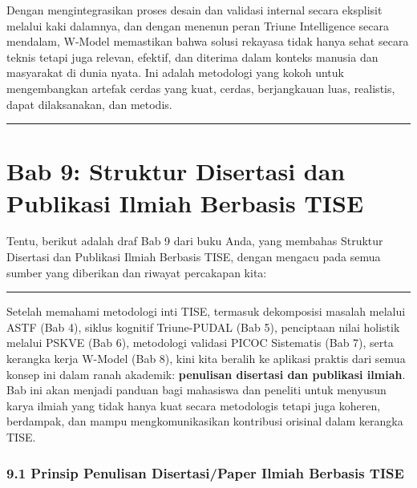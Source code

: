 \documentclass[
  letterpaper,
  DIV=11,
  numbers=noendperiod]{scrreprt}
\begin{document}
Dengan mengintegrasikan proses desain dan validasi internal secara
eksplisit melalui kaki dalamnya, dan dengan menenun peran Triune
Intelligence secara mendalam, W-Model memastikan bahwa solusi rekayasa
tidak hanya sehat secara teknis tetapi juga relevan, efektif, dan
diterima dalam konteks manusia dan masyarakat di dunia nyata. Ini adalah
metodologi yang kokoh untuk mengembangkan artefak cerdas yang kuat,
cerdas, berjangkauan luas, realistis, dapat dilaksanakan, dan metodis.

\begin{center}\rule{0.5\linewidth}{0.5pt}\end{center}


\chapter{\texorpdfstring{\textbf{Bab 9: Struktur Disertasi dan Publikasi
Ilmiah Berbasis
TISE}}{Bab 9: Struktur Disertasi dan Publikasi Ilmiah Berbasis TISE}}\label{bab-9-struktur-disertasi-dan-publikasi-ilmiah-berbasis-tise}

Tentu, berikut adalah draf Bab 9 dari buku Anda, yang membahas Struktur
Disertasi dan Publikasi Ilmiah Berbasis TISE, dengan mengacu pada semua
sumber yang diberikan dan riwayat percakapan kita:

\begin{center}\rule{0.5\linewidth}{0.5pt}\end{center}

Setelah memahami metodologi inti TISE, termasuk dekomposisi masalah
melalui ASTF (Bab 4), siklus kognitif Triune-PUDAL (Bab 5), penciptaan
nilai holistik melalui PSKVE (Bab 6), metodologi validasi PICOC
Sistematis (Bab 7), serta kerangka kerja W-Model (Bab 8), kini kita
beralih ke aplikasi praktis dari semua konsep ini dalam ranah akademik:
\textbf{penulisan disertasi dan publikasi ilmiah}. Bab ini akan menjadi
panduan bagi mahasiswa dan peneliti untuk menyusun karya ilmiah yang
tidak hanya kuat secara metodologis tetapi juga koheren, berdampak, dan
mampu mengkomunikasikan kontribusi orisinal dalam kerangka TISE.

\subsection{\texorpdfstring{\textbf{9.1 Prinsip Penulisan
Disertasi/Paper Ilmiah Berbasis
TISE}}{9.1 Prinsip Penulisan Disertasi/Paper Ilmiah Berbasis TISE}}\label{prinsip-penulisan-disertasipaper-ilmiah-berbasis-tise}
\end{document}
